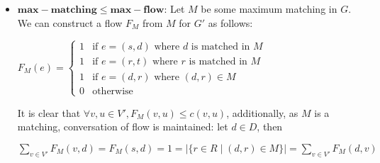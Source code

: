 \documentclass{article}
\begin{document}
\begin{enumerate}[label=(\alph*)]
\begin{enumerate}[label=(\roman*)]
\begin{itemize}
            \begin{center}
            $\sum_{v \in V'}{F(v, d)} = F(s, d) \leq 1$
            \end{center}
            and due to conservation of flow, we get that 
            
            \begin{center}
            $1 \geq \sum_{v \in V'}{F(v, d)} = \sum_{v \in V'}{F(d, v)} \geq F(d, r) + F(d, r') = 2$
            \end{center}
            which is a contradiction. Thus, no two edges in $M_F$ share the same source node. Symmetrically, no two edges in $M_F$ share the same target node. Thus, $M_F$ is a matching. Moreover, 
            
            \begin{center}
            $|F| = \sum_{v \in V'}{F(s, v)} = \sum_{d \in D}{F(s, d)} \overset{\text{conservation of flow}}{=} \sum_{d \in D}{\sum_{r \in R}{F(d, r)}} = \sum_{\substack{(d, r) \in D \times R \\ F(d, r) > 0}}{F(d, r)} = \sum_{(d, r) \in M_F}{F(d, r)} = \sum_{(d, r) \in M_F}{1} = |M_F|$
            \end{center}
            Thus, $|M_F| = |F| = max-flow$, and therefore $max-flow \leq max-matching$.

            \item $\mathbf{max-matching \leq max-flow}$: Let $M$ be some maximum matching in $G$. We can construct a flow $F_M$ from $M$ for $G'$ as follows:
        
            \begin{center}
                $F_M(e) = \begin{cases}
                    1 & \text{if $e = (s, d)$ where $d$ is matched in $M$}\\
                    1 & \text{if $e = (r, t)$ where $r$ is matched in $M$}\\
                    1 & \text{if $e = (d, r)$ where $(d, r) \in M$}\\
                    0 & \text{otherwise}
                \end{cases}$
            \end{center}
            
            It is clear that $\forall v, u \in V', F_M(v, u) \leq c(v, u)$, additionally, as $M$ is a matching, conversation of flow is maintained: let $d \in D$, then
            
            \begin{center}
            $\sum_{v \in V'}{F_M(v, d)} = F_M(s, d) = 1 = \left| \{r \in R \mid (d, r) \in M \} \right| = \sum_{v \in V'}{F_M(d, v)}$
            \end{center}
            

\end{itemize}
\end{enumerate}
\end{enumerate}
\end{document}
